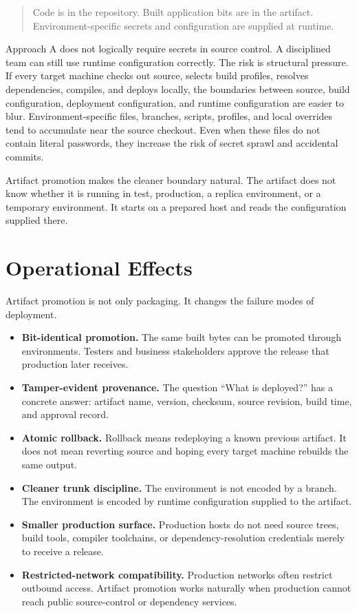 \documentclass[11pt]{article}
\begin{document}
\begin{quote}
Code is in the repository. Built application bits are in the artifact. Environment-specific secrets and configuration are supplied at runtime.
\end{quote}

Approach A does not logically require secrets in source control. A disciplined team can still use runtime configuration correctly. The risk is structural pressure. If every target machine checks out source, selects build profiles, resolves dependencies, compiles, and deploys locally, the boundaries between source, build configuration, deployment configuration, and runtime configuration are easier to blur. Environment-specific files, branches, scripts, profiles, and local overrides tend to accumulate near the source checkout. Even when these files do not contain literal passwords, they increase the risk of secret sprawl and accidental commits.

Artifact promotion makes the cleaner boundary natural. The artifact does not know whether it is running in test, production, a replica environment, or a temporary environment. It starts on a prepared host and reads the configuration supplied there.

\section{Operational Effects}

Artifact promotion is not only packaging. It changes the failure modes of deployment.

\begin{itemize}
\item \textbf{Bit-identical promotion.} The same built bytes can be promoted through environments. Testers and business stakeholders approve the release that production later receives.

\item \textbf{Tamper-evident provenance.} The question ``What is deployed?'' has a concrete answer: artifact name, version, checksum, source revision, build time, and approval record.

\item \textbf{Atomic rollback.} Rollback means redeploying a known previous artifact. It does not mean reverting source and hoping every target machine rebuilds the same output.

\item \textbf{Cleaner trunk discipline.} The environment is not encoded by a branch. The environment is encoded by runtime configuration supplied to the artifact.

\item \textbf{Smaller production surface.} Production hosts do not need source trees, build tools, compiler toolchains, or dependency-resolution credentials merely to receive a release.

\item \textbf{Restricted-network compatibility.} Production networks often restrict outbound access. Artifact promotion works naturally when production cannot reach public source-control or dependency services.
\end{itemize}
\end{document}
